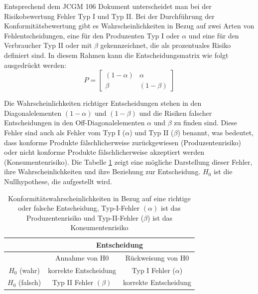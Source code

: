 Entsprechend dem JCGM 106 Dokument unterscheidet man bei der Risikobewertung Fehler Typ I und Typ II.
Bei der Durchführung der Konformitätsbewertung gibt es Wahrscheinlichkeiten in Bezug auf zwei Arten von Fehlentscheidungen, eine für den Produzenten Typ I oder $\alpha$ und eine für den Verbraucher Typ II oder mit $\beta$ gekennzeichnet, die als prozentuales Risiko definiert sind.  
In diesem Rahmen kann die Entscheidungsmatrix wie folgt ausgedrückt werden:
\begin{equation}
P = \left[ \begin{array}{cc}
	(1-\alpha)& \alpha \\ \beta & (1-\beta)
\end{array} 
\right]
\end{equation}

Die Wahrscheinlichkeiten richtiger Entscheidungen stehen in den Diagonalelementen $(1 - \alpha)$ und 
$(1 - \beta)$ und die Risiken falscher Entscheidungen in den Off-Diagonalelementen $\alpha$ und 
$\beta$ zu finden sind. Diese Fehler sind auch als Fehler vom Typ I ($\alpha$) und Typ II ($\beta$) benannt, was bedeutet, dass konforme Produkte fälschlicherweise zurückgewiesen (Produzentenrisiko) oder nicht konforme Produkte fälschlicherweise akzeptiert werden (Konsumentenrisiko). Die Tabelle \ref{tab:conformTable} zeigt eine mögliche Darstellung dieser Fehler, ihre Wahrscheinlichkeiten und ihre Beziehung zur Entscheidung. $H_0$ ist die Nullhypothese, die aufgestellt wird. 
\begin{table} 
	\caption{Konformitätswahrscheinlichkeiten in Bezug auf eine richtige oder falsche Entscheidung, Typ-I-Fehler $(\alpha)$ ist das Produzentenrisiko und Typ-II-Fehler ($\beta$) ist das Konsumentenrisiko}
	\label{tab:conformTable}
	\begin{center}
	\renewcommand{\arraystretch}{1.3}
	\begin{tabular}{|c|c|c|} \hline
	& \multicolumn{2}{c|}{Entscheidung} \\ \hline
		& Annahme von H0 & Rückweisung von H0 \\ \hline
		$H_0$ (wahr) & korrekte Entscheidung & Typ I  Fehler ($\alpha$) \\ \hline
		$H_0$ (falsch) & Typ II Fehler $(\beta)$ & korrekte Entscheidung \\ \hline
	\end{tabular}
	\end{center}
\end{table}
